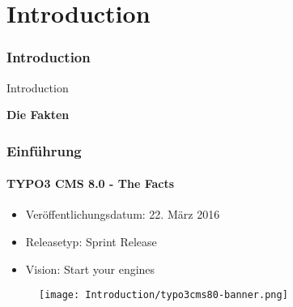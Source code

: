 %

\section{Introduction}
\begin{frame}[fragile]
	\frametitle{Introduction}

	\begin{center}\huge{Introduction}\end{center}
	\begin{center}\huge{\color{typo3darkgrey}\textbf{Die Fakten}}\end{center}

\end{frame}

\begin{frame}[fragile]
	\frametitle{Einführung}
	\framesubtitle{TYPO3 CMS 8.0 - The Facts}

	\begin{itemize}
		\item Veröffentlichungsdatum: 22. März 2016
		\item Releasetyp: Sprint Release
		\item Vision: Start your engines
	\end{itemize}

	\begin{figure}
		\texttt{[image: Introduction/typo3cms80-banner.png]}
	\end{figure}

\end{frame}

